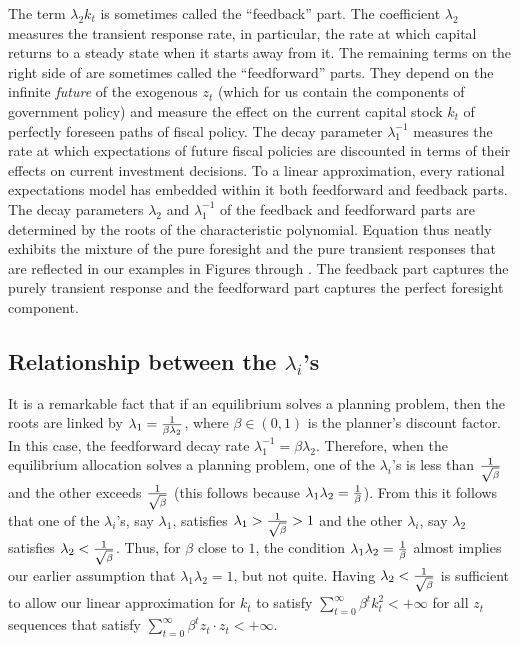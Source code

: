 The term $\lambda_2 k_t$ is sometimes called
the ``feedback'' part.  The coefficient $\lambda_2$
measures the transient response rate, in particular, the rate at which
capital returns to a steady state when it starts away
from it.  The remaining terms on the right side of   
are sometimes called the ``feedforward'' parts. They depend on the
infinite {\it future\/} of the exogenous $z_t$ (which for us
contain  the components of government policy) and measure the
effect on the current capital stock $k_t$ of perfectly foreseen
paths of fiscal policy.
The decay parameter $\lambda_1^{-1}$ measures the rate at which
expectations of future fiscal policies are discounted in terms
of their effects on current investment decisions.
To a linear approximation, every rational expectations model has embedded within it both
feedforward and feedback parts.  The decay parameters
$\lambda_2$ and $\lambda_1^{-1}$ of the feedback and feedforward
parts are determined by the roots of the characteristic
polynomial.
  Equation  thus neatly exhibits the mixture of the
pure foresight and  the pure transient  responses   that are
reflected in our examples in Figures   through . The
feedback part captures the purely transient response and the
feedforward part captures the perfect foresight component.

\subsection{Relationship between the $\lambda_i$'s}

It is a remarkable
fact that if an equilibrium solves a planning problem,
then the roots are linked by  $\lambda_1 = { 1 \over \beta \lambda_2}$, where
$\beta \in (0,1)$ is the planner's discount factor.  In this case, the feedforward decay rate
$\lambda_1^{-1} = \beta \lambda_2$.
  Therefore, when the equilibrium allocation
solves a planning problem, one of the $\lambda_i$'s is less than
${1\over \sqrt {\beta}}$ and the other exceeds ${1\over \sqrt {\beta}}$
(this follows because $\lambda_1 \lambda_2 = {1\over\beta}$). From this it follows
that one of the $\lambda_i$'s, say $\lambda_1$, satisfies $\lambda_1 > {1 \over \sqrt{\beta}} > 1$
and  the other $\lambda_i$, say $\lambda_2$ satisfies $\lambda_2 < {1\over \sqrt{\beta}}$.
Thus, for $\beta$ close to $1$,
the condition $\lambda_1 \lambda_2 = {1\over \beta}$ almost implies our earlier assumption
that $\lambda_1 \lambda_2=1$, but not quite.
Having $\lambda_2 < {1 \over \sqrt{\beta}}$ is sufficient to allow  our linear approximation for $k_t$
to satisfy $\sum_{t=0}^\infty \beta^t k_t^2 < +\infty$ for all $z_t$ sequences that satisfy
$\sum_{t=0}^\infty \beta^t z_t \cdot z_t < + \infty$.

